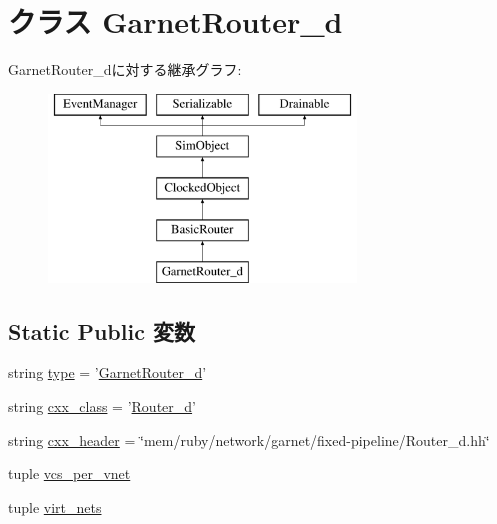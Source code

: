 \hypertarget{classGarnetNetwork__d_1_1GarnetRouter__d}{
\section{クラス GarnetRouter\_\-d}
\label{classGarnetNetwork__d_1_1GarnetRouter__d}
}
GarnetRouter\_\-dに対する継承グラフ:\begin{figure}[H]
\begin{center}
\leavevmode
\includegraphics[height=5cm]{classGarnetNetwork__d_1_1GarnetRouter__d}
\end{center}
\end{figure}
\subsection*{Static Public 変数}
\begin{DoxyCompactItemize}
\item 
string \hyperlink{classGarnetNetwork__d_1_1GarnetRouter__d_acce15679d830831b0bbe8ebc2a60b2ca}{type} = '\hyperlink{classGarnetNetwork__d_1_1GarnetRouter__d}{GarnetRouter\_\-d}'
\item 
string \hyperlink{classGarnetNetwork__d_1_1GarnetRouter__d_a58cd55cd4023648e138237cfc0822ae3}{cxx\_\-class} = '\hyperlink{classRouter__d}{Router\_\-d}'
\item 
string \hyperlink{classGarnetNetwork__d_1_1GarnetRouter__d_a17da7064bc5c518791f0c891eff05fda}{cxx\_\-header} = \char`\"{}mem/ruby/network/garnet/fixed-\/pipeline/Router\_\-d.hh\char`\"{}
\item 
tuple \hyperlink{classGarnetNetwork__d_1_1GarnetRouter__d_a2bb2221cda9b94b6a0c2944d8a12f31e}{vcs\_\-per\_\-vnet}
\item 
tuple \hyperlink{classGarnetNetwork__d_1_1GarnetRouter__d_a84c7a415611bc1b55aa5e7fd9e9601e8}{virt\_\-nets}
\end{DoxyCompactItemize}


